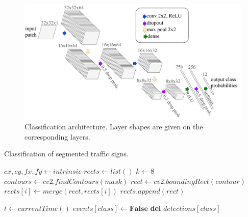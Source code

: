 \begin{figure}[h]
  \centering
  \includegraphics[width=.9\textwidth]{figures/classification-architecture.pdf}
  \caption[Classification architecture]{Classification architecture. Layer
    shapes are given on the corresponding layers.}
  \label{figure:classification-architecture}
\end{figure}

\begin{algorithm}[h]
  \caption{Classification of segmented traffic signs.}
  \label{algorithm:classification}
  \begin{algorithmic}[1]
    \State $cx, cy, fx, fy \gets intrinsic$
    \State $rects \gets list()$
    \State $k \gets 8$
    \State $contours \gets cv2.findContours(mask)$
      \State $rect \gets cv2.boundingRect(contour)$
        \State $rects[i] \gets merge(rect, rects[i])$
      \EndIf
      \State $rects.append(rect)$
    \EndFor

    \State $t \gets currentTime()$
      \State $events[class] \gets \textbf{False}$
        \State \textbf{del} $detections[class]$
      \EndIf
    \EndFor
  \end{algorithmic}
\end{algorithm}

